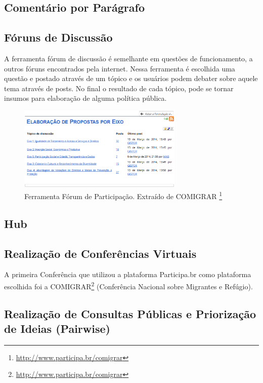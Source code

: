 \subsection{Comentário por Parágrafo}


\subsection{Fóruns de Discussão}

A ferramenta fórum de discussão é semelhante em questões de funcionamento, a outros fóruns encontrados pela internet. Nessa ferramenta é escolhida uma questão e postado através de um tópico e os usuários podem debater sobre aquele tema através de posts. No final o resultado de cada tópico, pode se tornar insumos para elaboração de alguma política pública.

\graphicspath{{figuras/}}
\begin{figure}[H]
\centering
\includegraphics[width=0.7\textwidth]{foruns-participacao}
\caption{Ferramenta Fórum de Participação. Extraído de COMIGRAR \footnote{\url{http://www.participa.br/comigrar}}}
\label{fig:rails-architecture}
\end{figure}

\subsection{Hub}

\subsection{Realização de Conferências Virtuais}

A primeira Conferência que utilizou a plataforma Participa.br como plataforma escolhida foi a COMIGRAR\footnote{\url{http://www.participa.br/comigrar}} (Conferência Nacional sobre Migrantes e Refúgio).

\subsection{Realização de Consultas Públicas e Priorização de Ideias (Pairwise)}

